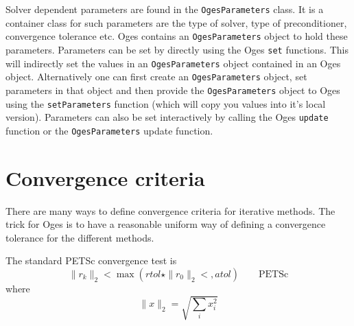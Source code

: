 \documentclass[11pt]{article}
\newcommand{\Index}[1]{#1\index{#1}}
\begin{document}
Solver dependent parameters are found in the {\tt OgesParameters} class.
It is a container class for such parameters are the type of solver, type of preconditioner,
convergence tolerance etc.
Oges contains an {\tt OgesParameters} object to hold these parameters.
Parameters can be set by directly using the Oges {\tt set} functions. This will indirectly
set the values in an {\tt OgesParameters} object contained in an Oges object.
Alternatively  one can first create an {\tt OgesParameters} object, set parameters in that
object and then provide the {\tt OgesParameters} object to Oges using the
{\tt setParameters} function (which will copy you values
into it's local version). Parameters can also be set interactively by calling the Oges
{\tt update} function or the {\tt OgesParameters} update function.




\section{Convergence criteria}

There are many ways to define \Index{convergence criteria} for iterative methods.
The trick for Oges is to have a reasonable uniform way of defining a 
convergence tolerance for the different methods.



The standard PETSc convergence test is
\[
    \| r_k \|_2 < \max ( rtol \star \| r_0 \|_2 <, atol ) \qquad \mbox{PETSc}
\]
where 
\[
   \| x \|_2 = \sqrt{ \sum_i x_i^2 }
\]
\end{document}
